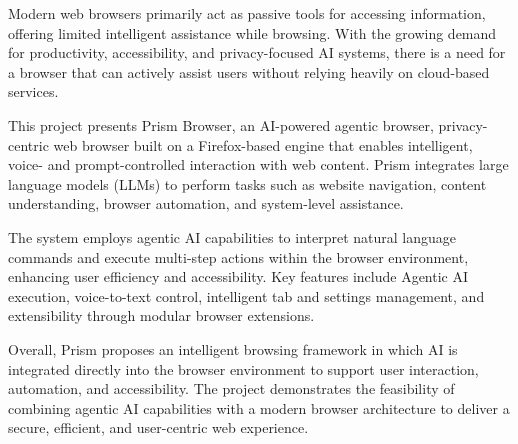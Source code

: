 \documentclass[12pt,a4paper]{article}
\begin{document}
{\fontsize{11}{13}\selectfont
Modern web browsers primarily act as passive tools for accessing information, offering limited intelligent assistance while browsing. With the growing demand for productivity, accessibility, and privacy-focused AI systems, there is a need for a browser that can actively assist users without relying heavily on cloud-based services.

This project presents Prism Browser, an AI-powered agentic browser, privacy-centric web browser built on a Firefox-based engine that enables intelligent, voice- and prompt-controlled interaction with web content. Prism integrates large language models (LLMs) to perform tasks such as website navigation, content understanding, browser automation, and system-level assistance.

The system employs agentic AI capabilities to interpret natural language commands and execute multi-step actions within the browser environment, enhancing user efficiency and accessibility. Key features include Agentic AI execution, voice-to-text control, intelligent tab and settings management, and extensibility through modular browser extensions.

Overall, Prism proposes an intelligent browsing framework in which AI is integrated directly into the browser environment to support user interaction, automation, and accessibility. The project demonstrates the feasibility of combining agentic AI capabilities with a modern browser architecture to deliver a secure, efficient, and user-centric web experience.
}

\vspace{0.3cm}

\end{document}

